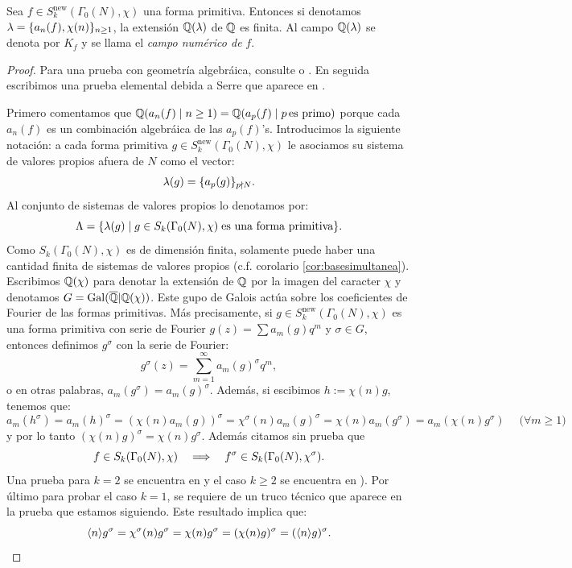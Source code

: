 \documentclass[../../tesis_maestria]{subfiles}
\begin{document}
\begin{prop}\label{prop:camponumerico}
  Sea $f\in S_k^{\mathrm{new}}(\Gamma_0(N),\chi)$ una forma primitiva. Entonces si denotamos
  $\lambda=\{a_n(f),\chi(n)\}_{n\geq1}$, la extensi\'on $\mathbb{Q}(\lambda)$ de $\mathbb{Q}$ es finita. Al campo
  $\mathbb{Q}(\lambda)$ se denota por $K_f$ y se llama el \emph{campo num\'erico de} $f$.
\end{prop}
\begin{proof}%
  Para una prueba con geometr\'ia algebr\'aica, consulte
  \cite[proposici\'on 2.7.3 de \S2]{DeligneSerreFMDP1} o \cite[\S6.5]{DiamondShurmanAFCIMF}.
  En seguida escribimos una prueba elemental debida a Serre que aparece en \cite[\S2.5]{SerreMFOW1AGR}.

  Primero comentamos que $\mathbb{Q}(a_n(f)\mid n\geq1)=\mathbb{Q}(a_p(f)\mid p\,\text{es primo})$ porque cada $a_n(f)$ es un
  combinaci\'on algebr\'aica de las $a_p(f)$'s. Introducimos la
  siguiente notaci\'on: a cada forma primitiva $g\in S_k^{\mathrm{new}}(\Gamma_0(N),\chi)$ le
  asociamos su sistema de valores propios afuera de $N$ como el vector:
  \[
    \lambda(g)=\{a_p(g)\}_{p\nmid N}.
  \]
  Al conjunto de sistemas de valores propios lo denotamos por:
  \[
    \Lambda=\{\lambda(g)\mid g\in S_k(\Gamma_0(N),\chi)\;\text{es una forma primitiva}\}.
  \]
  Como $S_k(\Gamma_0(N),\chi)$ es de dimensi\'on finita, solamente puede haber una cantidad finita de
  sistemas de valores propios (c.f. corolario \ref{cor:basesimultanea}).
  Escribimos $\mathbb{Q}(\chi)$ para denotar la extensi\'on de $\mathbb{Q}$ por la imagen del caracter $\chi$ y
  denotamos $G=\mathrm{Gal}(\overline{\mathbb{Q}}|\mathbb{Q}(\chi))$. Este gupo de Galois act\'ua sobre los coeficientes de Fourier
  de las formas primitivas. M\'as precisamente, si $g\in S_k^{\mathrm{new}}(\Gamma_0(N),\chi)$ es una forma primitiva 
  con serie de Fourier $g(z)=\sum a_m(g)q^m$ y $\sigma\in G$, entonces definimos $g^{\sigma}$ con la
  serie de Fourier:
  \[
    g^{\sigma}(z)=\sum_{m=1}^{\infty}a_m(g)^{\sigma}q^m,
  \]
  o en otras palabras, $a_m(g^{\sigma})=a_m(g)^{\sigma}$. Adem\'as, si escibimos $h:=\chi(n)g$, tenemos
  que:
  \[
    a_m(h^{\sigma})=a_m(h)^{\sigma}=(\chi(n)a_m(g))^{\sigma}=\chi^{\sigma}(n)a_m(g)^{\sigma}
                     =\chi(n)a_m(g^{\sigma})=a_m(\chi(n)g^{\sigma})\quad\;\big(\forall m\geq1\big)
  \]
  y por lo tanto $(\chi(n)g)^{\sigma}=\chi(n)g^{\sigma}$. Adem\'as citamos sin prueba que
  \[
    f\in S_k(\Gamma_0(N),\chi) \quad\Longrightarrow\quad f^{\sigma}\in S_k(\Gamma_0(N),\chi^{\sigma}).
  \]
  Una prueba para $k=2$ se encuentra en \cite[teorema 6.5.4]{DiamondShurmanAFCIMF} y el caso $k\geq2$ se
  encuentra en \cite[\S 3.5]{ShimuraITTATOAF}). Por \'ultimo para probar el caso $k=1$, se requiere de un truco
  t\'ecnico que aparece en la prueba que estamos siguiendo. Este resultado implica que:
  \begin{equation}\label{eq:diamsigma}
    \langle n \rangle g^{\sigma}=\chi^{\sigma}(n)g^{\sigma}=\chi(n)g^{\sigma}=(\chi(n)g)^{\sigma}=(\langle n \rangle g)^{\sigma}.
  \end{equation}
  


\end{proof}
\end{document}
